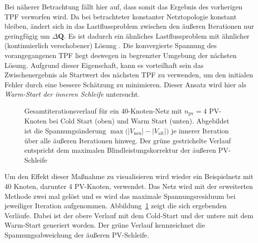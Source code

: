 Bei näherer Betrachtung fällt hier auf, dass somit das Ergebnis des vorherigen TPF verworfen wird.
Da bei betrachteter konstanter Netztopologie konstant bleiben, ändert sich in das Lastflussproblem zwischen den äußeren Iterationen nur geringfügig um $\Delta\mathbf{Q}$. 
Es ist dadurch ein ähnliches Lastflussproblem mit ähnlicher (kontinuierlich verschobener) Lösung \cite{7953996}.
Die konvergierte Spannung des vorangegangenen TPF liegt deswegen in begrenzter Umgebung der nächsten Lösung.
Aufgrund dieser Eigenschaft, kann es vorteilhaft sein das Zwischenergebnis als Startwert des nächsten TPF zu verwenden, um den initialen Fehler durch eine bessere Schätzung zu minimieren.
Dieser Ansatz wird hier als \emph{Warm-Start der inneren Schleife} untersucht.

	
	

\begin{figure}[htbp]
	\centering
	
	\caption{Gesamtiterationsverlauf für ein 40-Knoten-Netz mit
		$n_\mathrm{pv}=4$ PV-Knoten bei Cold Start (oben) und Warm Start (unten).
		Abgebildet ist die Spannungsänderung $\max\bigl(|V_\mathrm{neu}| -
		|V_\mathrm{alt}|\bigr)$ je innerer Iteration über alle äußeren Iterationen
		hinweg. Der grüne gestrichelte Verlauf entspricht dem maximalen Blindleistungskorrektur der äußeren PV-Schleife}
	\label{fig:inner_start_comparison}
\end{figure}


Um den Effekt dieser Maßnahme zu visualisieren wird wieder ein Beispielnetz mit 40 Knoten, darunter 4 PV-Knoten, verwendet.
Das Netz wird mit der erweiterten Methode zwei mal gelöst und es wird das maximale Spannungsresiduum bei jeweiliger Iteration aufgenommen.
Abbildung~\ref{fig:inner_start_comparison} zeigt die sich ergebenden Verläufe.
Dabei ist der obere Verlauf mit dem Cold-Start und der untere mit dem Warm-Start generiert worden.
Der grüne Verlauf kennzeichnet die Spannungsabweichung der äußeren PV-Schleife.\\

